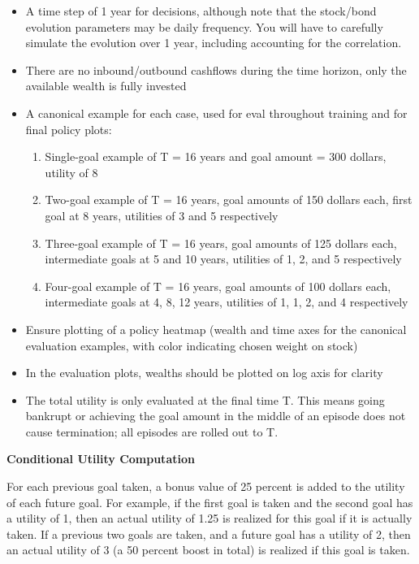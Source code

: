 \documentclass[mnsc,sglanonrev]{informs4}
\begin{document}
\begin{APPENDICES}
\begin{itemize}
    \item A time step of 1 year for decisions, although note that the stock/bond evolution parameters may be daily frequency. You will have to carefully simulate the evolution over 1 year, including accounting for the correlation.
    \item There are no inbound/outbound cashflows during the time horizon, only the available wealth is fully invested
    \item A canonical example for each case, used for eval throughout training and for final policy plots:
        \begin{enumerate}
            \item Single-goal example of T = 16 years and goal amount = 300 dollars, utility of 8
            \item Two-goal example of T = 16 years, goal amounts of 150 dollars each, first goal at 8 years, utilities of 3 and 5 respectively
            \item Three-goal example of T = 16 years, goal amounts of 125 dollars each, intermediate goals at 5 and 10 years, utilities of 1, 2, and 5 respectively
            \item Four-goal example of T = 16 years, goal amounts of 100 dollars each, intermediate goals at 4, 8, 12 years, utilities of 1, 1, 2, and 4 respectively
        \end{enumerate}
    \item Ensure plotting of a policy heatmap (wealth and time axes for the canonical evaluation examples, with color indicating chosen weight on stock)
    \item In the evaluation plots, wealths should be plotted on log axis for clarity
    \item The total utility is only evaluated at the final time T. This means going bankrupt or achieving the goal amount in the middle of an episode does not cause termination; all episodes are rolled out to T.
\end{itemize}

\textbf{Conditional Utility Computation}

For each previous goal taken, a bonus value of 25 percent is added to the utility of each future goal. For example, if the first goal is taken and the second goal has a utility of 1, then an actual utility of 1.25 is realized for this goal if it is actually taken. If a previous two goals are taken, and a future goal has a utility of 2, then an actual utility of 3 (a 50 percent boost in total) is realized if this goal is taken.


\end{APPENDICES}
\end{document}
